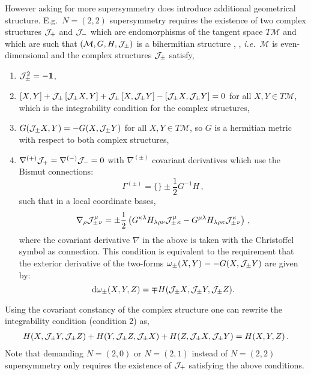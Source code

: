 \documentclass[12pt]{article}
\begin{document}
However asking for more supersymmetry does introduce additional geometrical structure. E.g.\ $N=(2,2)$ supersymmetry requires the existence of two complex structures $ {\cal J}_+$ and $ {\cal J}_-$ which are endomorphisms of the tangent space $T\mathcal{M}$ and which are such that $(\mathcal{M},G, H, {\cal J}_\pm)$ is a bihermitian structure \cite{Gates:1984nk}, \cite{Howe:1985pm}, {\em i.e.}\ $\mathcal{M}$ is even-dimensional and the complex structures ${\cal J}_\pm$ satisfy,
\begin{enumerate}
\item $ {\cal J}_\pm ^{2} = -{\bf 1}$,
\item $\left[ X,Y \right] + {\cal J}_\pm\left[{\cal J}_\pm X,Y \right] +{\cal J}_\pm \left[ X,{\cal J}_\pm Y \right]-\left[ {\cal J}_\pm X, {\cal J}_\pm Y \right] = 0$ for all $X,Y \in T\mathcal{M}$, which is the integrability condition for the complex structures,
\item $G({\cal J}_\pm X,Y) = - G(X, {\cal J}_\pm Y)$ for all $X,Y \in T\mathcal{M}$, so $G$ is a hermitian metric with respect to both complex structures,
\item $\nabla^{(+)} {\cal J}_+ = \nabla^{(-)} {\cal J}_- = 0$ with $\nabla^{(\pm)}$ covariant derivatives which use the Bismut connections:
\begin{equation}
\Gamma^{(\pm)} = \{ \} \pm \frac{1}{2} G^{-1} H\, ,
\end{equation}
such that in a local coordinate bases,
\begin{equation}
\nabla_{\rho}{\cal J}_{\pm}^{\mu}{}_\nu = \pm\frac{1}{2}\left(G^{\kappa\lambda}H_{\lambda\rho\nu}{\cal J}_{\pm}^{\mu}{}_\kappa - G^{\mu\lambda}H_{\lambda\rho\kappa}{\cal J}_{\pm}^{\kappa}{}_\nu \right)\,,
\end{equation}
where the covariant derivative $\nabla$ in the above is taken with the Christoffel symbol as connection.
This condition is equivalent to the requirement that the exterior derivative of the two-forms $\omega_\pm (X,Y) = -G(X,{\cal J}_\pm Y)$ are given by:
\begin{equation}
\mathrm{d}\omega_{\pm}(X,Y,Z) = \mp H ({\cal J}_\pm X,{\cal J}_\pm Y, {\cal J}_\pm Z).
\end{equation}
\end{enumerate}
Using the covariant constancy of the complex structure one can rewrite the integrability condition (condition 2) as,
\begin{eqnarray}
H(X, {\cal J}_\pm Y, {\cal J}_\pm Z)+H(Y, {\cal J}_\pm Z, {\cal J}_\pm X)+H(Z, {\cal J}_\pm X, {\cal J}_\pm Y)=H(X,Y,Z)\,. \label{kop3} 
\end{eqnarray} 
Note that demanding $N=(2,0)$ or $N=(2,1)$ instead of $N=(2,2)$ supersymmetry only requires the existence of $ {\cal J}_+$ satisfying the above conditions.  
 
\end{document}
